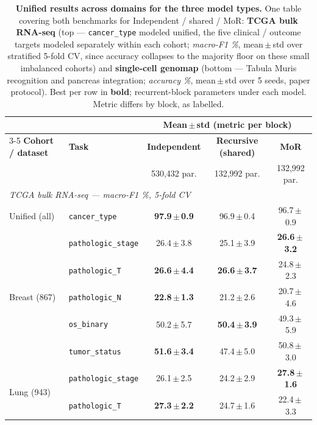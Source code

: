 \documentclass[11pt]{article}
\newcommand{\best}[1]{\textbf{#1}}
\begin{document}
\begin{table}[h]
\centering
\caption{\textbf{Unified results across domains for the three model types.} One table
covering both benchmarks for Independent / shared / MoR: \textbf{TCGA bulk RNA-seq}
(top --- \texttt{cancer\_type} modeled unified, the five clinical / outcome targets modeled
separately within each cohort; \emph{macro-F1 \%}, mean\,$\pm$\,std over stratified 5-fold CV,
since accuracy collapses to the majority floor on these small imbalanced cohorts) and
\textbf{single-cell genomap} (bottom --- Tabula Muris recognition and pancreas integration;
\emph{accuracy \%}, mean\,$\pm$\,std over 5 seeds, paper protocol). Best per row in
\textbf{bold}; recurrent-block parameters under each model. Metric differs by block, as
labelled.}
\label{tab:tasks}
\setlength{\tabcolsep}{5pt}
\footnotesize
\begin{tabular}{l l c c c}
\toprule
& & \multicolumn{3}{c}{\textbf{Mean\,$\pm$\,std (metric per block)}} \\
\cmidrule(lr){3-5}
\textbf{Cohort / dataset} & \textbf{Task} &
\textbf{Independent} & \textbf{Recursive (shared)} & \textbf{MoR} \\
& & {\footnotesize 530{,}432 par.} & {\footnotesize 132{,}992 par.} & {\footnotesize 132{,}992 par.} \\
\midrule
\multicolumn{5}{l}{\emph{TCGA bulk RNA-seq --- macro-F1 \%, 5-fold CV}}\\
\midrule
\rowcolor{morblue} Unified (all) & \texttt{cancer\_type} & \best{97.9\,$\pm$\,0.9} & 96.9\,$\pm$\,0.4 & 96.7\,$\pm$\,0.9 \\
\midrule
\multirow{5}{*}{Breast (867)}
 & \texttt{pathologic\_stage} & 26.4\,$\pm$\,3.8 & 25.1\,$\pm$\,3.9 & \best{26.6\,$\pm$\,3.2} \\
 & \texttt{pathologic\_T}     & \best{26.6\,$\pm$\,4.4} & \best{26.6\,$\pm$\,3.7} & 24.8\,$\pm$\,2.3 \\
 & \texttt{pathologic\_N}     & \best{22.8\,$\pm$\,1.3} & 21.2\,$\pm$\,2.6 & 20.7\,$\pm$\,4.6 \\
 & \texttt{os\_binary}        & 50.2\,$\pm$\,5.7 & \best{50.4\,$\pm$\,3.9} & 49.3\,$\pm$\,5.9 \\
 & \texttt{tumor\_status}     & \best{51.6\,$\pm$\,3.4} & 47.4\,$\pm$\,5.0 & 50.8\,$\pm$\,3.0 \\
\midrule
\multirow{5}{*}{Lung (943)}
 & \texttt{pathologic\_stage} & 26.1\,$\pm$\,2.5 & 24.2\,$\pm$\,2.9 & \best{27.8\,$\pm$\,1.6} \\
 & \texttt{pathologic\_T}     & \best{27.3\,$\pm$\,2.2} & 24.7\,$\pm$\,1.6 & 22.4\,$\pm$\,3.3 \\

\end{tabular}
\end{table}
\end{document}
